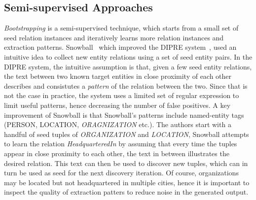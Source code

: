 \subsection{Semi-supervised Approaches}
\textit{Bootstrapping} is a semi-supervised technique, which starts from a small set of seed relation instances and iteratively learns more relation instances and extraction patterns.
Snowball~\cite{agichtein2000snowball} which improved the DIPRE system~\cite{brin1998extracting}, used an intuitive idea to collect new entity relations using a set of seed entity pairs.
In the DIPRE system, the intuitive assumption is that, given a few seed entity relations, the text between two known target entities in close proximity of each other describes and consistutes a \textit{pattern} of the relation between the two. 
Since that is not the case in practice, the system uses a limited set of regular expression to limit useful patterns, hence decreasing the number of false positives.
A key improvement of Snowball
is that Snowball's patterns include named-entity tags ({PERSON}, {LOCATION}, \textit{ORAGNIZATION} etc.).
The authors start with a handful of seed tuples of \textit{ORGANIZATION} and \textit{LOCATION}, Snowball attempts to learn the relation \textit{HeadquarteredIn} by assuming that every time the tuples appear in close proximity to each other, the text in between illustrates the desired relation.
This text can then be used to discover new tuples, which can in turn be used as seed for the next discovery iteration.
Of course, organizations may be located but not headquartered in multiple cities, hence it is important to inspect the quality of extraction patters to reduce noise in the generated output.

